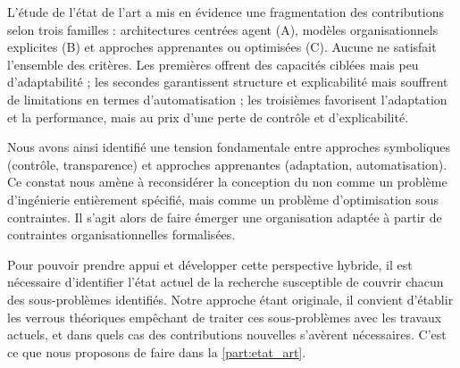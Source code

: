 L'étude de l'état de l'art a mis en évidence une fragmentation des contributions selon trois familles : architectures centrées agent (A), modèles organisationnels explicites (B) et approches apprenantes ou optimisées (C). Aucune ne satisfait l'ensemble des critères. Les premières offrent des capacités ciblées mais peu d'adaptabilité ; les secondes garantissent structure et explicabilité mais souffrent de limitations en termes d'automatisation ; les troisièmes favorisent l'adaptation et la performance, mais au prix d'une perte de contrôle et d'explicabilité.

Nous avons ainsi identifié une tension fondamentale entre approches symboliques (contrôle, transparence) et approches apprenantes (adaptation, automatisation). Ce constat nous amène à reconsidérer la conception du  non comme un problème d'ingénierie entièrement spécifié, mais comme un problème d'optimisation sous contraintes. Il s'agit alors de faire émerger une organisation adaptée à partir de contraintes organisationnelles formalisées.

Pour pouvoir prendre appui et développer cette perspective hybride, il est nécessaire d'identifier l'état actuel de la recherche susceptible de couvrir chacun des sous-problèmes identifiés. Notre approche étant originale, il convient d'établir les verrous théoriques empêchant de traiter ces sous-problèmes avec les travaux actuels, et dans quels cas des contributions nouvelles s'avèrent nécessaires. C'est ce que nous proposons de faire dans la \autoref{part:etat_art}.